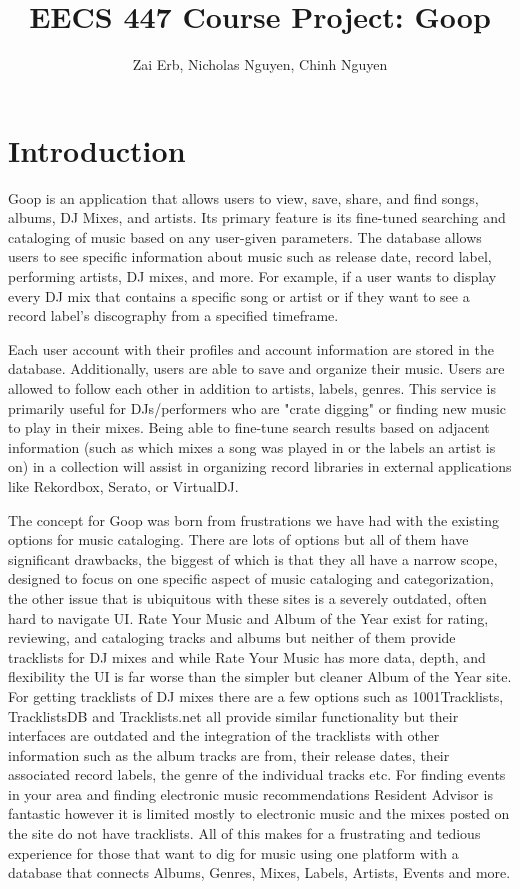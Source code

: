 \documentclass{article}
\title{EECS 447 Course Project: Goop}
\author{Zai Erb, Nicholas Nguyen, Chinh Nguyen}
\date{}
\begin{document}
\maketitle

\tableofcontents

\newpage

\section{Introduction}

\quad \quad Goop is an application that allows users to view, save, share, and find songs, albums, DJ Mixes, and artists. 
Its primary feature is its fine-tuned searching and cataloging of music based on any user-given parameters. 
The database allows users to see specific information about music such as release date, record label, performing artists, DJ mixes, and more. 
For example, if a user wants to display every DJ mix that contains a specific song or artist 
or if they want to see a record label's discography from a specified timeframe. 

Each user account with their profiles and account information are stored in the database. 
Additionally, users are able to save and organize their music. Users are allowed to follow each other in addition to artists, labels, genres. 
This service is primarily useful for DJs/performers who are "crate digging" or finding new music to play in their mixes. 
Being able to fine-tune search results based on adjacent information (such as which mixes a song was played in or the labels an artist is on) 
in a collection will assist in organizing record libraries in external applications like Rekordbox, Serato, or VirtualDJ. 

The concept for Goop was born from frustrations we have had with the existing options for music cataloging. 
There are lots of options but all of them have significant drawbacks, the biggest of which is that they all have a narrow scope, designed to focus on 
one specific aspect of music cataloging and categorization, the other issue that is ubiquitous with these sites is a severely outdated, often hard to navigate UI. 
Rate Your Music and Album of the Year exist for rating, reviewing, and cataloging tracks and albums but neither of them provide tracklists for DJ mixes and while
Rate Your Music has more data, depth, and flexibility the UI is far worse than the simpler but cleaner Album of the Year site. 
For getting tracklists of DJ mixes there are a few options such as 1001Tracklists, TracklistsDB and Tracklists.net all provide similar functionality
but their interfaces are outdated and the integration of the tracklists with other information such as the album tracks are from, 
their release dates, their associated record labels, the genre of the individual tracks etc. 
For finding events in your area and finding electronic music recommendations Resident Advisor is fantastic 
however it is limited mostly to electronic music and the mixes posted on the site do not have tracklists. 
All of this makes for a frustrating and tedious experience for those that want to dig for music using one platform with a database that connects 
Albums, Genres, Mixes, Labels, Artists, Events and more. 
\end{document}

